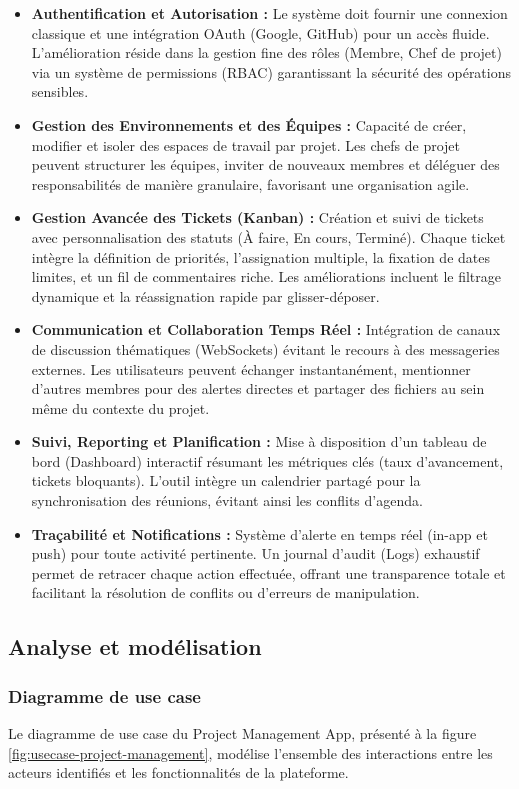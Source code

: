 \documentclass[12pt,a4paper]{report}
\begin{document}
	\begin{itemize}
		\item \textbf{Authentification et Autorisation :} Le système doit fournir une connexion classique et une intégration OAuth (Google, GitHub) pour un accès fluide. L'amélioration réside dans la gestion fine des rôles (Membre, Chef de projet) via un système de permissions (RBAC) garantissant la sécurité des opérations sensibles.
		\item \textbf{Gestion des Environnements et des Équipes :} Capacité de créer, modifier et isoler des espaces de travail par projet. Les chefs de projet peuvent structurer les équipes, inviter de nouveaux membres et déléguer des responsabilités de manière granulaire, favorisant une organisation agile.
		\item \textbf{Gestion Avancée des Tickets (Kanban) :} Création et suivi de tickets avec personnalisation des statuts (À faire, En cours, Terminé). Chaque ticket intègre la définition de priorités, l'assignation multiple, la fixation de dates limites, et un fil de commentaires riche. Les améliorations incluent le filtrage dynamique et la réassignation rapide par glisser-déposer.
		\item \textbf{Communication et Collaboration Temps Réel :} Intégration de canaux de discussion thématiques (WebSockets) évitant le recours à des messageries externes. Les utilisateurs peuvent échanger instantanément, mentionner d'autres membres pour des alertes directes et partager des fichiers au sein même du contexte du projet.
		\item \textbf{Suivi, Reporting et Planification :} Mise à disposition d'un tableau de bord (Dashboard) interactif résumant les métriques clés (taux d'avancement, tickets bloquants). L'outil intègre un calendrier partagé pour la synchronisation des réunions, évitant ainsi les conflits d'agenda.
		\item \textbf{Traçabilité et Notifications :} Système d'alerte en temps réel (in-app et push) pour toute activité pertinente. Un journal d'audit (Logs) exhaustif permet de retracer chaque action effectuée, offrant une transparence totale et facilitant la résolution de conflits ou d'erreurs de manipulation.
	\end{itemize}
	
	\subsection{Analyse et modélisation}
	
	\subsubsection{Diagramme de use case}
	Le diagramme de use case du Project Management App, présenté à la figure
	\ref{fig:usecase-project-management}, modélise l'ensemble des interactions entre les acteurs
	identifiés et les fonctionnalités de la plateforme.
	
\end{document}
